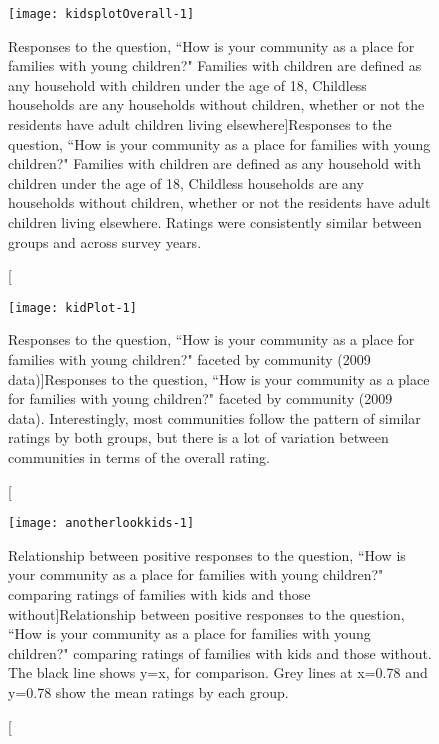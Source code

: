 \documentclass[smallextended]{svjour3}\usepackage[]{graphicx}\usepackage[]{color}
\newenvironment{knitrout}{}{} %
\begin{document}
\begin{knitrout}
\color{fgcolor}\begin{figure}

{\centering \texttt{[image: kidsplotOverall-1]} 

}

\caption[Responses to the question, ``How is your community as a place for families with young children?" Families with children are defined as any household with children under the age of 18, Childless households are any households without children, whether or not the residents have adult children living elsewhere]{Responses to the question, ``How is your community as a place for families with young children?" Families with children are defined as any household with children under the age of 18, Childless households are any households without children, whether or not the residents have adult children living elsewhere. Ratings were consistently similar between groups and across survey years.}\label{fig:kidsplotOverall}
\end{figure}


\end{knitrout}

\begin{knitrout}
\color{fgcolor}\begin{figure}

{\centering \texttt{[image: kidPlot-1]} 

}

\caption[Responses to the question, ``How is your community as a place for families with young children?" faceted by community (2009 data)]{Responses to the question, ``How is your community as a place for families with young children?" faceted by community (2009 data). Interestingly, most communities follow the pattern of similar ratings by both groups, but there is a lot of variation between communities in terms of the overall rating.}\label{fig:kidPlot}
\end{figure}


\end{knitrout}

\begin{knitrout}
\color{fgcolor}\begin{figure}

{\centering \texttt{[image: anotherlookkids-1]} 

}

\caption[Relationship between positive responses to the question, ``How is your community as a place for families with young children?" comparing ratings of families with kids and those without]{Relationship between positive responses to the question, ``How is your community as a place for families with young children?" comparing ratings of families with kids and those without. The black line shows y=x, for comparison. Grey lines at x=0.78 and y=0.78 show the mean ratings by each group.}\label{fig:anotherlookkids}
\end{figure}


\end{knitrout}
\end{document}
